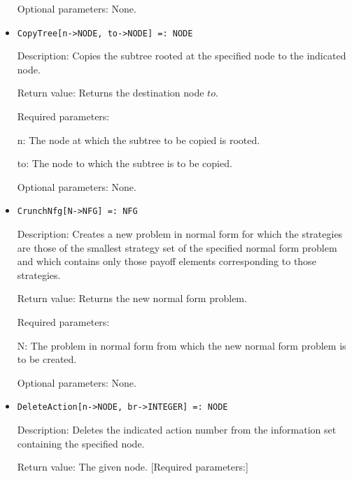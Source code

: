\begin{itemize}
\item
[Optional parameters:] None.
\ed

\item

\protect \large \begin{verbatim}
CopyTree[n->NODE, to->NODE] =: NODE
\end{verbatim}\normalsize

\bd
\item
[Description:] Copies the subtree rooted at the specified node to the
indicated node.
\item
[Return value:] Returns the destination node $to$.
\item
[Required parameters:]\hfil\null

\bd
\item	
[n:] The node at which the subtree to be copied is rooted.
\item
[to:] The node to which the subtree is to be copied.
\ed

\item
[Optional parameters:] None.
\ed

\item
\protect \large \begin{verbatim}
CrunchNfg[N->NFG] =: NFG
\end{verbatim}\normalsize

\bd
\item
[Description:] Creates a new problem in normal form for which the
strategies are those of the smallest strategy set of the specified
normal form problem and which contains only those payoff elements
corresponding to those strategies.
\item
[Return value:] Returns the new normal form problem.
\item
[Required parameters:]\hfil\null
	
\bd
\item
[N:] The problem in normal form from which the new normal form problem
is to be created.
\ed

\item  
[Optional parameters:] None.
\ed


\item
\protect \large \begin{verbatim}
DeleteAction[n->NODE, br->INTEGER] =: NODE
\end{verbatim}\normalsize

\bd
\item
[Description:] Deletes the indicated action number from the
information set containing the specified node.
\item
[Return value:] The given node.  [Required parameters:]\hfil\null
	

\end{itemize}

